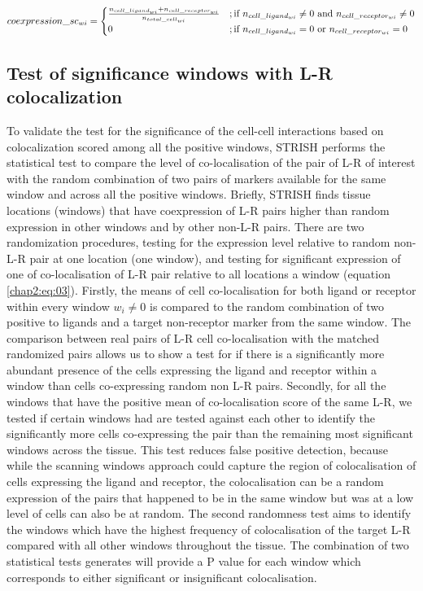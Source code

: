 \begin{equation}
    coexpression\_sc_{wi} = \begin{cases}
    \frac{n_{cell\_ligand_{wi}} + n_{cell\_receptor_{wi}} }{n_{total\_cell_{wi}}}&;\text{if $ n_{cell\_ligand_{wi}} \neq 0$ and $n_{cell\_receptor_{wi}} \neq 0$}\\
    0              & ;\text{if $ n_{cell\_ligand_{wi}} = 0$ or $n_{cell\_receptor_{wi}} = 0$}
    \label{chap2:eq:02}
\end{cases}
\end{equation}

\subsection{Test of significance windows with L-R colocalization}
To validate the test for the significance of the cell-cell interactions based on colocalization scored among all the positive windows, STRISH performs the statistical test to compare the level of co-localisation of the pair of L-R of interest with the random combination of two pairs of markers available for the same window and across all the positive windows. Briefly, STRISH finds tissue locations (windows) that have coexpression of L-R pairs higher than random expression in other windows and by other non-L-R pairs. There are two randomization procedures, testing for the expression level relative to random non-L-R pair at one location (one window), and testing for significant expression of one of co-localisation of L-R pair relative to all locations a window (equation \ref{chap2:eq:03}). Firstly, the means of cell co-localisation for both ligand or receptor within every window $w_i \neq 0$ is compared to the random combination of two positive to ligands and a target non-receptor marker from the same window. The comparison between real pairs of L-R cell co-localisation with the matched randomized pairs allows us to show a test for if there is a significantly more abundant presence of the cells expressing  the ligand and receptor within a window than cells co-expressing random non L-R pairs. Secondly, for all the windows that have the positive mean of co-localisation score of the same L-R, we tested if certain windows had  are tested against each other to identify the significantly more cells co-expressing the pair than the remaining  most significant windows across the tissue. This test reduces false positive detection, because while the scanning windows approach could capture the region of colocalisation of cells expressing the ligand and receptor, the colocalisation can be a random expression of the pairs that happened to be in the same window but was at a low level of cells can also be at random. The second randomness test aims to identify the windows which have the highest frequency of colocalisation of the target L-R compared with all other windows throughout the tissue. The combination of two statistical tests generates will provide a P value for each window which corresponds to either significant or insignificant colocalisation.

